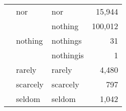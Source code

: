 \begin{longtable}[ht]{lllr}
\cline{2-4}
 & nor & nor & {\cellcolor[HTML]{E9BCF5}} \color[HTML]{000000} 15,944 \\
\cline{2-4}
 & \multirow[c]{3}{*}{nothing} & nothing & {\cellcolor[HTML]{5B0081}} \color[HTML]{F1F1F1} 100,012 \\
 &  & nothings & {\cellcolor[HTML]{E6E6FA}} \color[HTML]{000000} 31 \\
 &  & nothingis & {\cellcolor[HTML]{E6E6FA}} \color[HTML]{000000} 1 \\
\cline{2-4}
 & rarely & rarely & {\cellcolor[HTML]{E7DAF9}} \color[HTML]{000000} 4,480 \\
\cline{2-4}
 & scarcely & scarcely & {\cellcolor[HTML]{E6E5FA}} \color[HTML]{000000} 797 \\
\cline{2-4}
 & seldom & seldom & {\cellcolor[HTML]{E6E4FA}} \color[HTML]{000000} 1,042 \\
\cline{1-4} \cline{2-4}
\end{longtable}

